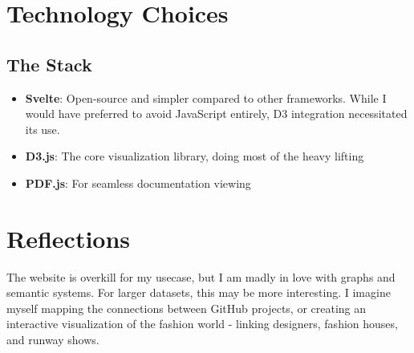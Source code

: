 \documentclass[10pt,a4paper]{article}
\begin{document}
\section{Technology Choices}
\subsection{The Stack}
\begin{itemize}
	\item \textbf{Svelte}: Open-source and simpler compared to other frameworks. While I would have preferred to avoid JavaScript entirely, D3 integration necessitated its use.
	\item \textbf{D3.js}: The core visualization library, doing most of the heavy lifting
	\item \textbf{PDF.js}: For seamless documentation viewing
\end{itemize}

\section{Reflections}

The website is overkill for my usecase, but I am madly in love with graphs and semantic systems. For larger datasets, this may be more interesting. I imagine myself mapping the connections between GitHub projects, or creating an interactive visualization of the fashion world - linking designers, fashion houses, and runway shows.
\end{document}
